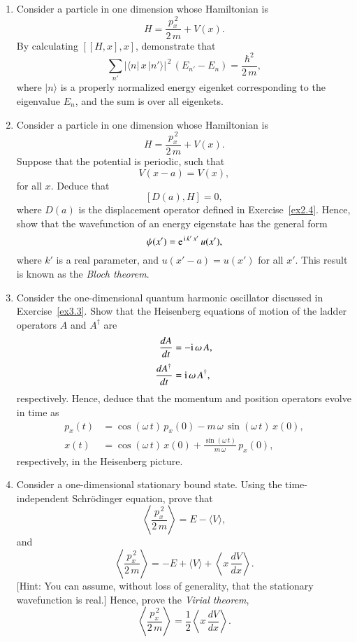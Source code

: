 \begin{enumerate}[label=\thechapter.\arabic*,leftmargin=*,widest=9.20]
\item Consider a particle in one dimension whose Hamiltonian is
$$
H = \frac{p_x^{\,2}}{2\,m} + V(x).
$$
By calculating $[[H,x], x]$, demonstrate that
$$
\sum_{n'} |\langle n|\,x\,|n'\rangle|^{\,2}\,(E_{n'}-E_{n})= \frac{\hbar^2}{2\,m},
$$
where $|n\rangle$ is a properly normalized energy eigenket corresponding to the eigenvalue $E_n$, and the
sum is over all eigenkets. 

\item Consider a particle in one dimension whose Hamiltonian is
$$
H = \frac{p_x^{\,2}}{2\,m} + V(x).
$$
Suppose that the potential is periodic, such that
$$
V(x-a)= V(x),
$$
for all $x$. Deduce that
$$
[D(a),H] = 0,
$$
where $D(a)$ is the displacement operator defined in Exercise~\ref{ex2.4}. Hence, show that the wavefunction of
an energy eigenstate has the general form
$$
\psi(x') = {\rm e}^{\,{\rm i}\,k'\,x'}\,u(x'),
$$
where $k'$ is a real parameter, and $u(x'-a)=u(x')$ for all $x'$. This result is known as the {\em Bloch theorem}. 

\item Consider  the one-dimensional quantum harmonic oscillator discussed in Exercise~\ref{ex3.3}. Show that the Heisenberg equations of motion of the ladder operators $A$ and $A^\dag$ are 
\begin{align}
\frac{dA}{dt} &= -{\rm i}\,\omega\,A,\nonumber\\[0.5ex]
\frac{dA^\dag}{dt}&= {\rm i}\,\omega\,A^\dag,\nonumber
\end{align}
respectively.
Hence, deduce that the momentum and position operators evolve in time as
\begin{align}
p_x(t)&= \cos(\omega\,t) \,p_x(0)- m\,\omega\,\sin(\omega\,t)\,x(0),\nonumber\\[0.5ex]
x(t) &= \cos(\omega\,t)\,x(0) + \frac{\sin(\omega\,t)}{m\,\omega}\,p_x(0),\nonumber
\end{align}
respectively, in the Heisenberg picture. 

\item Consider a one-dimensional stationary bound state. Using the time-independent Schr\"{o}dinger equation,
prove that
$$
\left\langle \frac{p_x^{\,2}}{2\,m}\right\rangle =  E- \langle V\rangle,
$$
and
$$
\left\langle \frac{p_x^{\,2}}{2\,m}\right\rangle = -E  + \langle V\rangle+\left\langle x\,\frac{dV}{dx}\right\rangle.
$$
[Hint: You can assume, without loss of generality, that the stationary wavefunction is real.] Hence, prove the {\em Virial
theorem}, 
$$
\left\langle \frac{p_x^{\,2}}{2\,m}\right\rangle =\frac{1}{2}\left\langle x\,\frac{dV}{dx}\right\rangle.
$$\label{ex3.5}
\end{enumerate}

